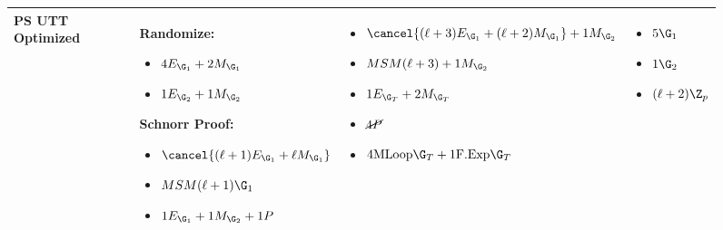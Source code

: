 \begin{figure}
\begin{tabular}{|l|p{4.5cm}|p{4.5cm}|p{3.5cm}|}
             PS UTT Optimized &
            \textbf{Randomize:}
            \begin{itemize}[nosep]
                \item $4E_{\G_1} + 2M_{\G_1}$ 
                \item $1E_{\G_2} + 1M_{\G_2}$
            \end{itemize}
            \textbf{Schnorr Proof:}
            \begin{itemize}[nosep]
                \item $\cancel{(\ell+1)E_{\G_1} + \ell M_{\G_1}}$
                \item $MSM(\ell + 1)\G_1$ 
                \item $1E_{\G_1} + 1M_{\G_2} + 1P$ 
            \end{itemize}
            &
            \begin{itemize}[nosep]
                \item $\cancel{(\ell+3)E_{\G_1} + (\ell+2)M_{\G_1}} + 1M_{\G_2}$
                \item $MSM(\ell+3) + 1M_{\G_2}$
                \item $1E_{\G_T} + 2M_{\G_T}$
                \item $\cancel{4P}$ 
                \item $4\text{MLoop}\G_T + 1\text{F.Exp}\G_T$ 
            \end{itemize}
            &
            \begin{itemize}[nosep]
                \item $5\G_1$
                \item $1\G_2$
                \item $(\ell+2)\Z_p$
            \end{itemize}
            \\
             \hline
        \end{tabular}
\end{figure}

% 
% 


